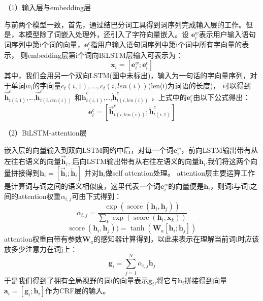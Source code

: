 （1）输入层与embedding层

与前两个模型一致，首先，通过结巴分词工具得到词序列完成输入层的工作。但是，本模型除了词嵌入处理外，还引入了字符向量嵌入。设
$\mathbf{e}_{i}^{w}$表示用户输入语句词序列中第i个词的向量，$\mathbf{e}_{i}^{c}$指用户输入语句词序列中第i个词中所有字向量的表示，
则embedding层第i个词向BiLSTM层输入可表示为：
\begin{equation}
  \mathbf{x}_{i}=[\mathbf{e}_{i}^{w} ;\mathbf{e}_{i}^{c}]
\end{equation}
其中，我们会用另一个双向LSTM(图中未标出)，输入为一句话的字向量序列，对于单词$w_i$的字向量$c_t(i,1),\dots,c_t(i,len(i))$(len(i)为词语的长度)，
可以得到$\overrightarrow{\mathbf{h}}_{t(i, 1)}^{c}$,\dots,$\overrightarrow{\mathbf{h}}_{t(i, len(i))}^{c}$
和$\overleftarrow{\mathbf{h}}_{t(i, 1)}^{c}$,\dots,$\overleftarrow{\mathbf{h}}_{t(i, len(i))}^{c}$ ，上式中的$\mathbf{e}_{i}^{c}$由以下公式得出：
\begin{equation}
  \mathbf{e}_{i}^{c}=[\overrightarrow{\mathbf{h}}_{t(i, len(i))}^{c} ; \overleftarrow{\mathbf{h}}_{t(i, 1)}^{c}]
\end{equation}

（2）BiLSTM-attention层

嵌入层的向量输入到双向LSTM网络中后，对每一个词$\mathbf{e}_{i}^{w}$，前向LSTM输出带有从左往右语义的向量$\overrightarrow{\mathbf{h}}_{i}$,
后向LSTM输出带有从右往左语义的向量$\overleftarrow{\mathbf{h}}_{i}$,我们将这两个向量拼接得到$\mathbf{h}_{i}=[\overrightarrow{\mathbf{h}}_{i} ;\overleftarrow{\mathbf{h}}_{i}]$
并对$\mathbf{h}_{i}$做self attention处理。
attention层主要运算工作是计算词与词之间的语义相似度，这里代表一个词$\mathbf{e}_{i}^{w}$的向量便是$\mathbf{h}_{i}$，则词i与词j之间的attention权重$α_{i,j}$可由下式得到：
\begin{equation}
\alpha_{t, j}=\frac{\exp \left(\operatorname{score}\left(\mathbf{h}_{i}, \mathbf{h}_{j}\right)\right)}{\sum_{k} \exp \left(\operatorname{score}\left(\mathbf{h}_{i}, \mathbf{x}_{k}\right)\right)}
\end{equation}
\begin{equation}
  \operatorname{score}(\mathbf{h}_{i}, \mathbf{h}_{j}))=\tanh \left(\mathbf{W}_{a}\left[\mathbf{h}_{i} ; \mathbf{h}_{j}\right]\right)
\end{equation}
attention权重由带有参数$\mathbf{W}_{a}$的感知器计算得到，以此来表示在理解当前词i时应该放多少注意力在词j上：
\begin{equation}
  \mathbf{g}_{i}=\sum_{j=1}^{N} \alpha_{i, j} \mathbf{h}_{j}
\end{equation}
于是我们得到了拥有全局视野的词i的向量表示$\mathbf{g}_{i}$,将它与$\mathbf{h}_{i}$拼接得到向量$\mathbf{a}_{i}=[\mathbf{g}_{i} ;\mathbf{h}_{i}]$作为CRF层的输入。

